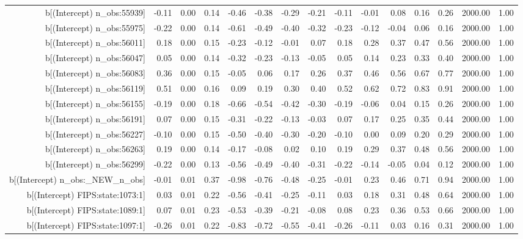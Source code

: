 \begin{table}[ht]
\begin{tabular}{rrrrrrrrrrrrrrr}
  b[(Intercept) n\_obs:55939] & -0.11 & 0.00 & 0.14 & -0.46 & -0.38 & -0.29 & -0.21 & -0.11 & -0.01 & 0.08 & 0.16 & 0.26 & 2000.00 & 1.00 \\ 
  b[(Intercept) n\_obs:55975] & -0.22 & 0.00 & 0.14 & -0.61 & -0.49 & -0.40 & -0.32 & -0.23 & -0.12 & -0.04 & 0.06 & 0.16 & 2000.00 & 1.00 \\ 
  b[(Intercept) n\_obs:56011] & 0.18 & 0.00 & 0.15 & -0.23 & -0.12 & -0.01 & 0.07 & 0.18 & 0.28 & 0.37 & 0.47 & 0.56 & 2000.00 & 1.00 \\ 
  b[(Intercept) n\_obs:56047] & 0.05 & 0.00 & 0.14 & -0.32 & -0.23 & -0.13 & -0.05 & 0.05 & 0.14 & 0.23 & 0.33 & 0.40 & 2000.00 & 1.00 \\ 
  b[(Intercept) n\_obs:56083] & 0.36 & 0.00 & 0.15 & -0.05 & 0.06 & 0.17 & 0.26 & 0.37 & 0.46 & 0.56 & 0.67 & 0.77 & 2000.00 & 1.00 \\ 
  b[(Intercept) n\_obs:56119] & 0.51 & 0.00 & 0.16 & 0.09 & 0.19 & 0.30 & 0.40 & 0.52 & 0.62 & 0.72 & 0.83 & 0.91 & 2000.00 & 1.00 \\ 
  b[(Intercept) n\_obs:56155] & -0.19 & 0.00 & 0.18 & -0.66 & -0.54 & -0.42 & -0.30 & -0.19 & -0.06 & 0.04 & 0.15 & 0.26 & 2000.00 & 1.00 \\ 
  b[(Intercept) n\_obs:56191] & 0.07 & 0.00 & 0.15 & -0.31 & -0.22 & -0.13 & -0.03 & 0.07 & 0.17 & 0.25 & 0.35 & 0.44 & 2000.00 & 1.00 \\ 
  b[(Intercept) n\_obs:56227] & -0.10 & 0.00 & 0.15 & -0.50 & -0.40 & -0.30 & -0.20 & -0.10 & 0.00 & 0.09 & 0.20 & 0.29 & 2000.00 & 1.00 \\ 
  b[(Intercept) n\_obs:56263] & 0.19 & 0.00 & 0.14 & -0.17 & -0.08 & 0.02 & 0.10 & 0.19 & 0.29 & 0.37 & 0.48 & 0.56 & 2000.00 & 1.00 \\ 
  b[(Intercept) n\_obs:56299] & -0.22 & 0.00 & 0.13 & -0.56 & -0.49 & -0.40 & -0.31 & -0.22 & -0.14 & -0.05 & 0.04 & 0.12 & 2000.00 & 1.00 \\ 
  b[(Intercept) n\_obs:\_NEW\_n\_obs] & -0.01 & 0.01 & 0.37 & -0.98 & -0.76 & -0.48 & -0.25 & -0.01 & 0.23 & 0.46 & 0.71 & 0.94 & 2000.00 & 1.00 \\ 
  b[(Intercept) FIPS:state:1073:1] & 0.03 & 0.01 & 0.22 & -0.56 & -0.41 & -0.25 & -0.11 & 0.03 & 0.18 & 0.31 & 0.48 & 0.64 & 2000.00 & 1.00 \\ 
  b[(Intercept) FIPS:state:1089:1] & 0.07 & 0.01 & 0.23 & -0.53 & -0.39 & -0.21 & -0.08 & 0.08 & 0.23 & 0.36 & 0.53 & 0.66 & 2000.00 & 1.00 \\ 
  b[(Intercept) FIPS:state:1097:1] & -0.26 & 0.01 & 0.22 & -0.83 & -0.72 & -0.55 & -0.41 & -0.26 & -0.11 & 0.03 & 0.16 & 0.31 & 2000.00 & 1.00 \\ 

\end{tabular}
\end{table}
